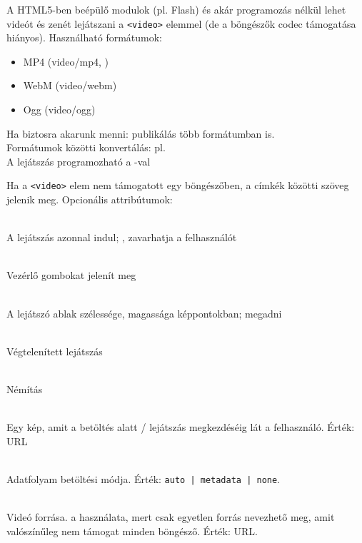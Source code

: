 \begin{frame}
  A HTML5-ben beépülő modulok (pl. Flash) és akár programozás nélkül 
  lehet videót és zenét lejátszani a \texttt{<video>} elemmel (de a böngészők codec 
  támogatása hiányos). Használható formátumok:
  \begin{itemize}
    \item MP4 (video/mp4, )
    \item WebM (video/webm)
    \item Ogg (video/ogg)
  \end{itemize}
  Ha biztosra akarunk menni: publikálás több formátumban is.\\
  Formátumok közötti konvertálás: pl. 
  \\
  A lejátszás programozható a -val\\
\end{frame}

\begin{frame}
  Ha a \texttt{<video>} elem nem támogatott egy böngészőben, a 
  címkék közötti szöveg jelenik meg. Opcionális attribútumok:
  \begin{description}[m]
    \item[\texttt{<autoplay>}] \hfill \\ A lejátszás azonnal indul; 
    , zavarhatja a felhasználót
    \item[\texttt{<controls>}] \hfill \\ Vezérlő gombokat jelenít meg
    \item[\texttt{<width>}, \texttt{<height>}] \hfill \\ A lejátszó 
    ablak szélessége, magassága képpontokban;  megadni
    \item[\texttt{<loop>}] \hfill \\ Végtelenített lejátszás
  \end{description}
\end{frame}

\begin{frame}
  \begin{description}[m]
    \item[\texttt{<muted>}] \hfill \\ Némítás
    \item[\texttt{<poster>}] \hfill \\ Egy kép, amit a betöltés 
    alatt / lejátszás megkezdéséig lát a felhasználó. Érték: URL
    \item[\texttt{<preload>}] \hfill \\ Adatfolyam betöltési módja. 
    Érték: \texttt{auto | metadata | none}.
    \item[\texttt{<src>}] \hfill \\ Videó forrása.  a használata, mert csak egyetlen forrás nevezhető meg, 
    amit valószínűleg nem támogat minden böngésző. Érték: URL.
  \end{description}
\end{frame}

